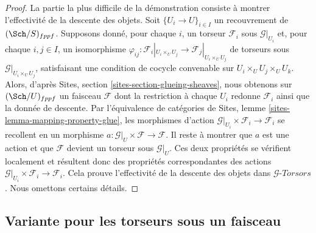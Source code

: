 \begin{proof}
La partie la plus difficile de la démonstration consiste à montrer
l'effectivité de la descente des objets.
Soit $\{U_i \to U\}_{i \in I}$ un recouvrement de $(\Sch/S)_{fppf}$.
Supposons donné, pour chaque $i$, un torseur $\mathcal{F}_i$
sous $\mathcal{G}|_{U_i}$ et, pour chaque $i, j \in I$, un isomorphisme
$\varphi_{ij} :
\mathcal{F}_i|_{U_i \times_U U_j} \to \mathcal{F}_j|_{U_i \times_U U_j}$
de torseurs sous $\mathcal{G}|_{U_i \times_U U_j}$,
satisfaisant une condition de cocycle convenable sur $U_i \times_U U_j \times_U U_k$.
Alors, d'après
Sites, section \ref{sites-section-glueing-sheaves},
nous obtenons sur $(\Sch/U)_{fppf}$ un faisceau $\mathcal{F}$
dont la restriction à chaque $U_i$ redonne $\mathcal{F}_i$ ainsi que
la donnée de descente. Par l'équivalence de catégories de
Sites, lemme \ref{sites-lemma-mapping-property-glue},
les morphismes d'action $\mathcal{G}|_{U_i} \times \mathcal{F}_i \to \mathcal{F}_i$
se recollent en un morphisme $a : \mathcal{G}|_U \times \mathcal{F} \to \mathcal{F}$.
Il reste à montrer que $a$ est une action et que $\mathcal{F}$ devient
un torseur sous $\mathcal{G}|_U$. Ces deux propriétés se vérifient localement
et résultent donc des propriétés correspondantes des actions
$\mathcal{G}|_{U_i} \times \mathcal{F}_i \to \mathcal{F}_i$.
Cela prouve l'effectivité de la descente des objets dans
$\mathcal{G}\textit{-Torsors}$.
Nous omettons certains détails.
\end{proof}



\subsection{Variante pour les torseurs sous un faisceau}
\label{subsection-variant-torsor-sheaf}

